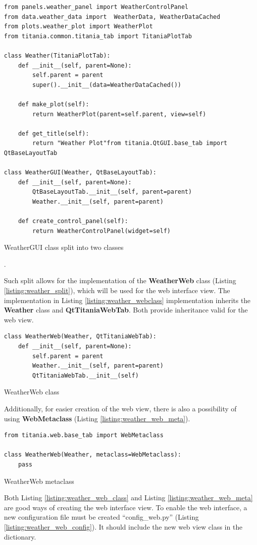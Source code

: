 \begin{listing}[!ht]
\begin{verbatim}
from panels.weather_panel import WeatherControlPanel
from data.weather_data import  WeatherData, WeatherDataCached
from plots.weather_plot import WeatherPlot
from titania.common.titania_tab import TitaniaPlotTab

class Weather(TitaniaPlotTab):
    def __init__(self, parent=None):
        self.parent = parent
        super().__init__(data=WeatherDataCached())

    def make_plot(self):
        return WeatherPlot(parent=self.parent, view=self)

    def get_title(self):
        return "Weather Plot"from titania.QtGUI.base_tab import QtBaseLayoutTab

class WeatherGUI(Weather, QtBaseLayoutTab):
    def __init__(self, parent=None):
        QtBaseLayoutTab.__init__(self, parent=parent)
        Weather.__init__(self, parent=parent)

    def create_control_panel(self):
        return WeatherControlPanel(widget=self)
\end{verbatim}


\caption{WeatherGUI class split into two classes}.
\label{listing:weather_split}
\end{listing}
Such split allows for the implementation of the \textbf{WeatherWeb} class (Listing \ref{listing:weather_split}), which will be used for the web interface view.
The implementation in Listing \ref{listing:weather_webclass} implementation inherits the \textbf{Weather} class and \textbf{QtTitaniaWebTab}.
Both provide inheritance valid for the web view.
\begin{listing}[!ht]
\begin{verbatim}
class WeatherWeb(Weather, QtTitaniaWebTab):
    def __init__(self, parent=None):
        self.parent = parent
        Weather.__init__(self, parent=parent)
        QtTitaniaWebTab.__init__(self)
\end{verbatim}
\caption{WeatherWeb class}
\label{listing:weather_webclass}
\end{listing}
Additionally, for easier creation of the web view, there is also a possibility of using \textbf{WebMetaclass} (Listing \ref{listing:weather_web_meta}).
\begin{listing}[!ht]
\begin{verbatim}
from titania.web.base_tab import WebMetaclass

class WeatherWeb(Weather, metaclass=WebMetaclass):
    pass
\end{verbatim}
\caption{WeatherWeb metaclass}
\label{listing:weather_web_meta}
\end{listing}
Both Listing \ref{listing:weather_web_class} and Listing \ref{listing:weather_web_meta} are good ways of creating the web interface view.
To enable the web interface, a new configuration file must be created ``config\_web.py'' (Listing \ref{listing:weather_web_config}). It should include the new web view class in the dictionary.

